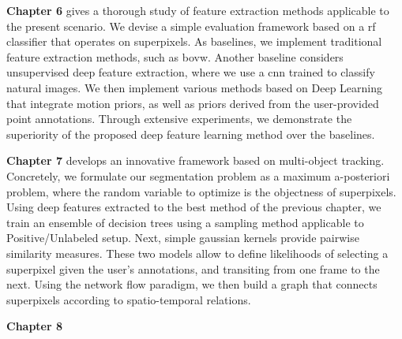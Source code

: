 \textbf{Chapter 6} gives a thorough study of feature extraction methods applicable to the present scenario.
We devise a simple evaluation framework based on a \gls{rf} classifier that operates on superpixels.
As baselines, we implement traditional feature extraction methods, such as \gls{bovw}.
Another baseline considers unsupervised deep feature extraction, where we use a \gls{cnn} trained to classify natural images.
We then implement various methods based on Deep Learning that integrate motion priors, as well as priors derived from the user-provided point annotations.
Through extensive experiments, we demonstrate the superiority of the proposed deep feature learning method over the baselines.

\textbf{Chapter 7} develops an innovative framework based on multi-object tracking.
Concretely, we formulate our segmentation problem as a maximum a-posteriori problem, where the random variable to optimize is the objectness of superpixels.
Using deep features extracted to the best method of the previous chapter, we train an ensemble of decision trees using a sampling method applicable to Positive/Unlabeled setup.
Next, simple gaussian kernels provide pairwise similarity measures.
These two models allow to define likelihoods of selecting a superpixel given the user's annotations, and transiting from one frame to the next.
Using the network flow paradigm, we then build a graph that connects superpixels according to spatio-temporal relations.

\textbf{Chapter 8}


